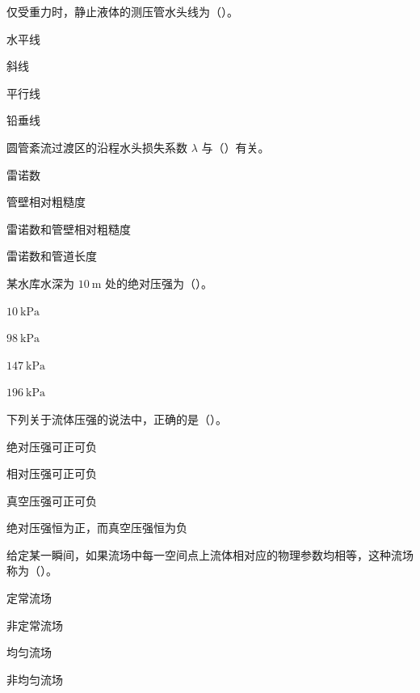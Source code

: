 \begin{ti}
\item 仅受重力时，静止液体的测压管水头线为（\quad）。
\begin{choices}
\item 水平线
\item 斜线
\item 平行线
\item 铅垂线
\end{choices}

\item 圆管紊流过渡区的沿程水头损失系数 $\lambda$ 与（\quad）有关。
\begin{choices}
\item 雷诺数
\item 管壁相对粗糙度
\item 雷诺数和管壁相对粗糙度
\item 雷诺数和管道长度
\end{choices}

\item 某水库水深为 $10\ \mathrm{m}$ 处的绝对压强为（\quad）。
\begin{choices}
\item $10\ \mathrm{kPa}$
\item $98\ \mathrm{kPa}$
\item $147\ \mathrm{kPa}$
\item $196\ \mathrm{kPa}$
\end{choices}

\item 下列关于流体压强的说法中，正确的是（\quad）。
\begin{choices}
\item 绝对压强可正可负
\item 相对压强可正可负
\item 真空压强可正可负
\item 绝对压强恒为正，而真空压强恒为负
\end{choices}

\item 给定某一瞬间，如果流场中每一空间点上流体相对应的物理参数均相等，这种流场称为（\quad）。
\begin{choices}
\item 定常流场
\item 非定常流场
\item 均匀流场
\item 非均匀流场
\end{choices}


\end{ti}
